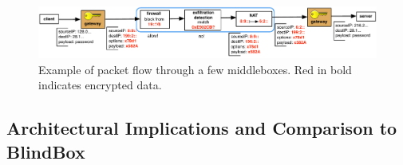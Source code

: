 \begin{figure}[t!]
\begin{center}
  \includegraphics[width=6.7in]{fig/packetpath.pdf}
\caption{Example of packet flow through a few middleboxes. Red in bold indicates encrypted data. \label{fig:packetflow} }
\end{center}
\end{figure}


%
%
%




\subsection{Architectural Implications and Comparison to BlindBox} \label{s:archbb}


